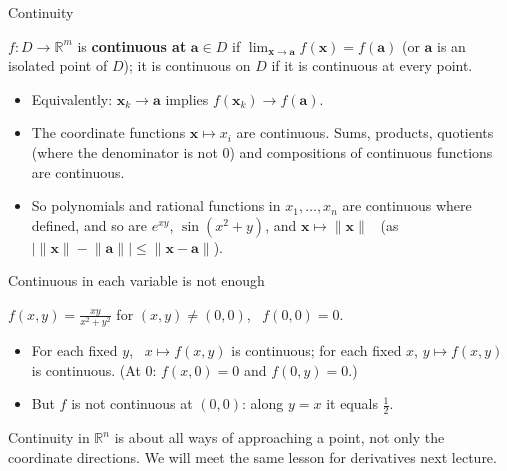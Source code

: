 \documentclass[10pt]{wosm-slides}
\newcommand{\R}{\mathbb{R}}
\newcommand{\norm}[1]{\lVert #1 \rVert}
\newcommand{\vx}{\mathbf{x}}
\newcommand{\va}{\mathbf{a}}
\begin{document}
\begin{frame}{Continuity}
  \begin{definition}
    $f\colon D \to \R^m$ is \textbf{continuous at} $\va \in D$ if $\lim_{\vx \to \va} f(\vx) = f(\va)$
    (or $\va$ is an isolated point of $D$); it is continuous on $D$ if it is continuous at every point.
  \end{definition}
  \begin{itemize}
    \item Equivalently: $\vx_k \to \va$ implies $f(\vx_k) \to f(\va)$.
    \item The coordinate functions $\vx \mapsto x_i$ are continuous. Sums, products, quotients
      (where the denominator is not $0$) and compositions of continuous functions are continuous.
    \item So polynomials and rational functions in $x_1, \dots, x_n$ are continuous where
      defined, and so are $e^{xy}$, $\sin(x^2 + y)$, and $\vx \mapsto \norm{\vx}$
      \ (as $\bigl|\norm{\vx} - \norm{\va}\bigr| \le \norm{\vx - \va}$).
  \end{itemize}
\end{frame}

\begin{frame}{Continuous in each variable is not enough}
  \begin{example}
    $f(x, y) = \frac{xy}{x^2 + y^2}$ for $(x, y) \ne (0, 0)$, \ $f(0, 0) = 0$.
    \begin{itemize}
      \item For each fixed $y$, \ $x \mapsto f(x, y)$ is continuous; for each fixed $x$,
        $y \mapsto f(x, y)$ is continuous. (At $0$: $f(x, 0) = 0$ and $f(0, y) = 0$.)
      \item But $f$ is not continuous at $(0, 0)$: along $y = x$ it equals $\frac12$.
    \end{itemize}
  \end{example}
  \pause
  Continuity in $\R^n$ is about all ways of approaching a point, not only the coordinate
  directions. We will meet the same lesson for derivatives next lecture.
\end{frame}
\end{document}
